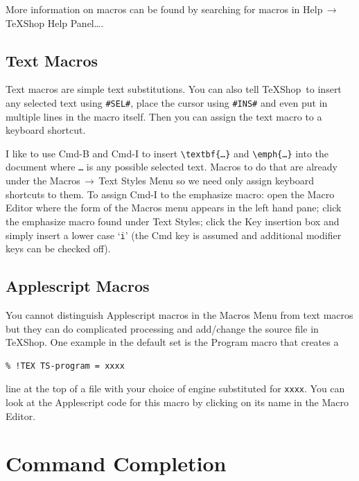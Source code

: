 \documentclass[letterpaper,11pt]{article}
\newcommand{\TS}{\textsf{\TeX Shop}}
\newcommand{\cmd}[1]{\textsf{#1}}
\newcommand{\mnu}[1]{\textsf{#1}}
\newcommand{\To}{\,\(\to\)\,}
\begin{document}
More information on macros can be found by searching for \cmd{macros} in \mnu{Help}\To\mnu{TeXShop Help Panel…}.

\subsection{Text Macros}

Text macros are simple text substitutions. You can also tell \TS\ to insert any selected text using \verb|#SEL#|, place the cursor using \verb|#INS#| and even put in multiple lines in the macro itself. Then you can assign the text macro to a keyboard shortcut.

I like to use \cmd{Cmd-B} and \cmd{Cmd-I} to insert \verb|\textbf{…}| and \verb|\emph{…}| into the document where \texttt{…} is any possible selected text. Macros to do that are already under the \mnu{Macros}\To\mnu{Text Styles} Menu so we need only assign keyboard shortcuts to them. To assign \cmd{Cmd-I} to the \mnu{emphasize} macro: open the \mnu{Macro Editor} where the form of the \mnu{Macros} menu appears in the left hand pane; click the \mnu{emphasize} macro found under \mnu{Text Styles}; click the Key insertion box and simply insert a lower case `\texttt{i}' (the \cmd{Cmd} key is assumed and additional modifier keys can be checked off).

\subsection{Applescript Macros}

You cannot distinguish Applescript macros in the \mnu{Macros} Menu from text macros but they can do complicated processing and add/change the source file in \TS. One example in the default set is the \mnu{Program} macro that creates a
\begin{verbatim}
% !TEX TS-program = xxxx
\end{verbatim}
line at the top of a file with your choice of engine substituted for \texttt{xxxx}. You can look at the Applescript code for this macro by clicking on its name in the \mnu{Macro Editor}.


\section{Command Completion}\label{sec:CC}
\end{document}
